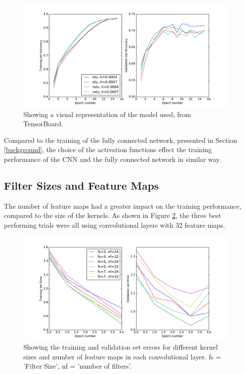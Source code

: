 \documentclass[]{article}
\begin{document}
\begin{figure}[h]
	\includegraphics[width=\textwidth]{ac_res}
	\caption{Showing a visual representation of the model used, from TensorBoard.}
	\label{ac_res}
	\centering
\end{figure}

Compared to the training of the fully connected network, presented in Section \ref{background}, the choice of the activation functions effect the training performance of the CNN and the fully connected network in similar way. 

\subsection{Filter Sizes and Feature Maps}

The number of feature maps had a greater impact on the training performance, compared to the size of the kernels. As shown in Figure \ref{kernel_res}, the three best performing trials were all using convolutional layers with 32 feature maps. 

\begin{figure}[h]
	\includegraphics[width=\textwidth]{kernel_res}
	\caption{Showing the training and validation set errors for different kernel sizes and number of feature maps in each convolutional layer. fs = 'Filter Size', nf = 'number of filters'. }
	\label{kernel_res}
	\centering
\end{figure}
\end{document}
